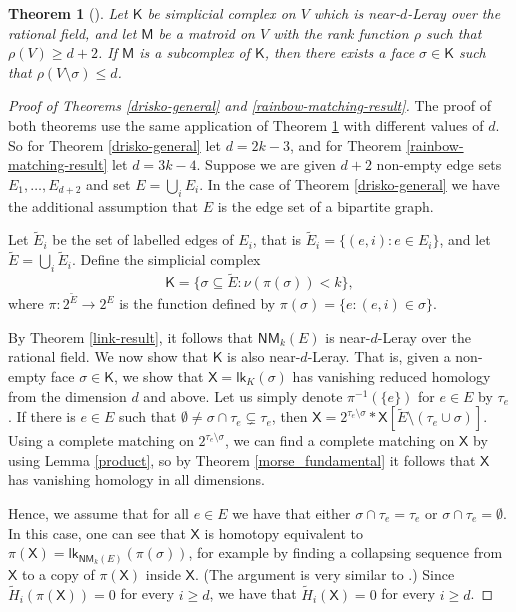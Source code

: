 \documentclass[10pt]{amsart}
\newcommand{\lk}{\mathsf{lk}}
\newcommand{\NM}{\mathsf{NM}}
\newtheorem{thm}{Theorem}[section]
\theoremstyle{definition}
\begin{document}
	
	\begin{thm}[\cite{holmsen_colorful_caratheodory}]
		\label{holmsen}
		Let $\mathsf{K}$ be simplicial complex on $V$ which is near-$d$-Leray over the rational field, and let $\mathsf{M}$ be a
		matroid on $V$ with the rank function $\rho$ such that $\rho(V)\geq d+2$. If $\mathsf{M}$ is a subcomplex of $\mathsf{K}$,
		then there exists a face $\sigma \in \mathsf{K}$ such that $\rho(V \setminus \sigma) \leq d$. 
	\end{thm}
	
	
	\begin{proof}[Proof of Theorems \ref{drisko-general} and \ref{rainbow-matching-result}] The proof of both theorems use the same application of Theorem \ref{holmsen} with different values of $d$. So for 
		Theorem \ref{drisko-general} let $d = 2k-3$, and for  Theorem \ref{rainbow-matching-result} let $d = 3k-4$. Suppose we are given $d+2$ non-empty edge sets $E_1, \dots, E_{d+2}$ and set $E=\bigcup_i E_i$. In the case of Theorem \ref{drisko-general} we have the additional assumption that $E$ is the edge set of a bipartite graph.
		
		Let $\tilde{E}_i$ be the set of labelled edges of $E_i$, that is $\tilde{E}_i= \{(e, i): e \in E_i \}$, and let $\tilde{E}= \bigcup_i \tilde{E}_i$. Define the simplicial complex 
		\[\mathsf{K} = \{\sigma  \subseteq  \tilde{E} : \nu(\pi(\sigma)) < k\},\] where $\pi:2^{\tilde{E}}\to 2^{E}$ is the function defined by $\pi(\sigma)=\{e: (e,i)\in \sigma \}$.  
		
		By Theorem \ref{link-result}, it follows that $\NM_k(E)$ is near-$d$-Leray over the rational field. We now show that $\mathsf{K}$ is also near-$d$-Leray. That is, given a non-empty face $\sigma \in \mathsf{K}$, we show that $\mathsf{X}=\lk_K(\sigma)$ has vanishing reduced homology from the dimension $d$ and above. Let us simply denote $\pi^{-1}(\{e\})$ for $e\in E$ by $\tau_e$.
		If there is $e \in E$ such that $\emptyset\ne \sigma\cap \tau_e \subsetneq \tau_e$, then  $\mathsf{X}=2^{\tau_e\setminus \sigma} * \mathsf{X}[\tilde{E}\setminus (\tau_e\cup \sigma)]$. Using a complete matching on $2^{\tau_e\setminus \sigma}$, we can find a complete matching on $\mathsf{X}$ by using Lemma \ref{product}, so by Theorem \ref{morse_fundamental} it follows  that $\mathsf{X}$ has vanishing homology in all dimensions. 
		
		Hence, we assume that for all $e \in E$ we have that either $\sigma\cap \tau_e=\tau_e$ or $\sigma\cap \tau_e=\emptyset$. In this case, one can see that $\mathsf{X}$ is homotopy equivalent to $\pi(\mathsf{X})=\lk_{\NM_k(E)}(\pi(\sigma))$, for example by finding a collapsing sequence from $\mathsf{X}$ to a copy of $\pi(\mathsf{X})$ inside $\mathsf{X}$. (The argument is very similar to \cite[Proposition 2.1]{aharoni_holzman_jiang}.) Since $\tilde{H}_i(\pi(\mathsf{X}))=0$ for every $i\geq d$, we have that $\tilde{H}_i(\mathsf{X}) =0$ for every $i\geq d$.
		

\end{proof}
\end{document}

